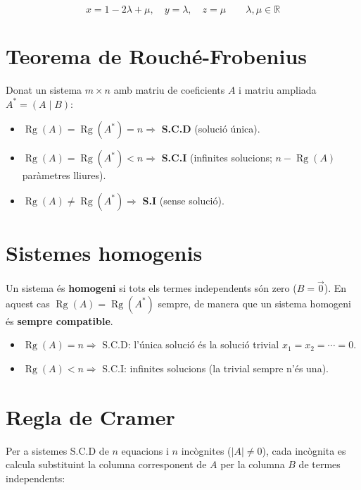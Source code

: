 \begin{equation*}
x = 1 - 2\lambda + \mu, \quad y = \lambda, \quad z = \mu \qquad \lambda, \mu \in \mathbb{R}
\end{equation*}

\section{Teorema de Rouché-Frobenius}

Donat un sistema $m\times n$ amb matriu de coeficients $A$ i matriu ampliada $A^* = (A \mid B)$:

\begin{itemize}
\item $\operatorname{Rg}(A) = \operatorname{Rg}(A^*) = n \Rightarrow$ \textbf{S.C.D} (solució única).
\item $\operatorname{Rg}(A) = \operatorname{Rg}(A^*) < n \Rightarrow$ \textbf{S.C.I} (infinites solucions; $n - \operatorname{Rg}(A)$ paràmetres lliures).
\item $\operatorname{Rg}(A) \neq \operatorname{Rg}(A^*) \Rightarrow$ \textbf{S.I} (sense solució).
\end{itemize}

\section{Sistemes homogenis}

Un sistema és \textbf{homogeni} si tots els termes independents són zero ($B = \vec 0$). En aquest cas $\operatorname{Rg}(A) = \operatorname{Rg}(A^*)$ sempre, de manera que un sistema homogeni és \textbf{sempre compatible}.

\begin{itemize}
\item $\operatorname{Rg}(A) = n \Rightarrow$ S.C.D: l'única solució és la solució trivial $x_1 = x_2 = \cdots = 0$.
\item $\operatorname{Rg}(A) < n \Rightarrow$ S.C.I: infinites solucions (la trivial sempre n'és una).
\end{itemize}

\section{Regla de Cramer}

Per a sistemes S.C.D de $n$ equacions i $n$ incògnites ($|A| \neq 0$), cada incògnita es calcula substituint la columna corresponent de $A$ per la columna $B$ de termes independents:

